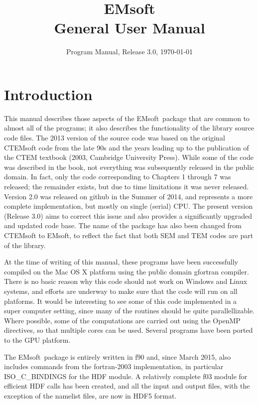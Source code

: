 \documentclass[DIV=calc, paper=letter, fontsize=11pt]{scrartcl}	 %
\title{EMsoft\\ General User Manual} %
\author{\vspace*{-0.7in}} %
\date{Program Manual, Release 3.0, \today}
\newcommand{\ctp}{\textsf{EMsoft}}
\begin{document}
\maketitle

\renewcommand{\contentsname}{Table of Contents}
{\small\tableofcontents}

\newpage
\section{Introduction}
This manual describes those aspects of the \ctp\ package that are common to almost all of the programs; it also describes the functionality of 
the library source code files.  The 2013 version of the source code was based on the original CTEMsoft code from the late 90s and the years 
leading up to the publication of the CTEM textbook (2003, Cambridge University Press).  While some of the code was described in the 
book, not everything was subsequently released in the public domain.  In fact, only the code corresponding to Chapters 1 through 7 was 
released; the remainder exists, but due to time limitations it was never released.  Version 2.0 was released on github in the Summer of 
2014, and represents a more complete implementation, but mostly on single (serial) CPU. The present version (Release 3.0) aims to correct this issue and also
provides a significantly upgraded and updated code base.  The name of the package has also been changed from CTEMsoft to \ctp, to reflect the 
fact that both SEM and TEM codes are part of the library.

At the time of writing of this manual, these programs have been successfully compiled on the Mac OS X platform using the public domain gfortran compiler.  
There is no basic reason why this code should not work on Windows and Linux systems, and efforts are underway
to make sure that the code will run on all platforms. It would be interesting to see some of this code
implemented in a super computer setting, since many of the routines should be quite parallellizable.  Where possible, some of the computations
are carried out using the OpenMP directives, so that multiple cores can be used.  Several programs have been ported to the GPU platform.

The \ctp\ package is entirely written in f90 and, since March 2015, also includes commands from the fortran-2003 implementation, in 
particular ISO\_C\_BINDINGS for the HDF module.  A relatively complete f03 module for efficient HDF calls has been created, and all
the input and output files, with the exception of the namelist files, are now in HDF5 format.
\end{document}
